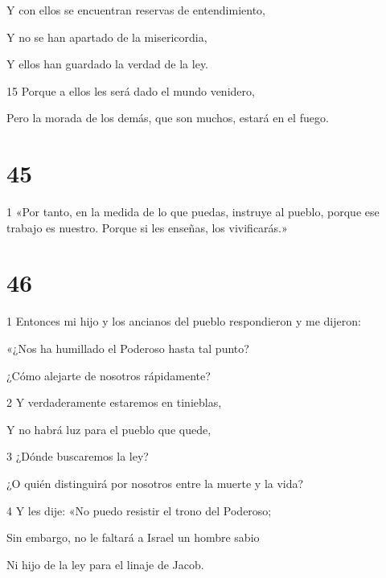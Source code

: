 \par Y con ellos se encuentran reservas de entendimiento,

\par Y no se han apartado de la misericordia,

\par Y ellos han guardado la verdad de la ley.

\par 15 Porque a ellos les será dado el mundo venidero,

\par Pero la morada de los demás, que son muchos, estará en el fuego.

\chapter{45}

\par 1 «Por tanto, en la medida de lo que puedas, instruye al pueblo, porque ese trabajo es nuestro. Porque si les enseñas, los vivificarás.»

\chapter{46}

\par 1 Entonces mi hijo y los ancianos del pueblo respondieron y me dijeron:

\par «¿Nos ha humillado el Poderoso hasta tal punto?

\par ¿Cómo alejarte de nosotros rápidamente?

\par 2 Y verdaderamente estaremos en tinieblas,

\par Y no habrá luz para el pueblo que quede,

\par 3 ¿Dónde buscaremos la ley?

\par ¿O quién distinguirá por nosotros entre la muerte y la vida?

\par 4 Y les dije: «No puedo resistir el trono del Poderoso;

\par Sin embargo, no le faltará a Israel un hombre sabio

\par Ni hijo de la ley para el linaje de Jacob.

